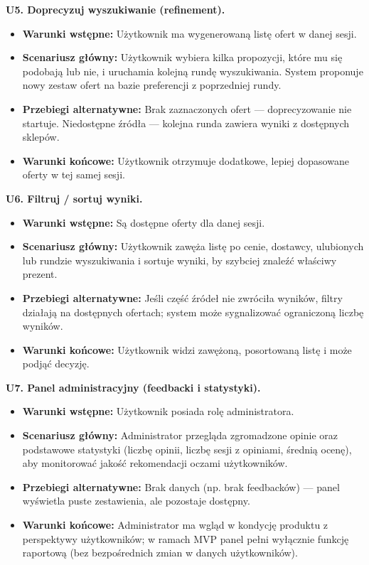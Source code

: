 \documentclass[12pt,a4paper]{article}
\begin{document}
\textbf{U5. Doprecyzuj wyszukiwanie (refinement).}
\begin{itemize}
    \item \textbf{Warunki wstępne:} Użytkownik ma wygenerowaną listę ofert w danej sesji.
    \item \textbf{Scenariusz główny:} Użytkownik wybiera kilka propozycji, które mu się podobają lub nie, i uruchamia kolejną rundę wyszukiwania. System proponuje nowy zestaw ofert na bazie preferencji z poprzedniej rundy.
    \item \textbf{Przebiegi alternatywne:} Brak zaznaczonych ofert — doprecyzowanie nie startuje. Niedostępne źródła — kolejna runda zawiera wyniki z dostępnych sklepów.
    \item \textbf{Warunki końcowe:} Użytkownik otrzymuje dodatkowe, lepiej dopasowane oferty w tej samej sesji.
\end{itemize}

\textbf{U6. Filtruj / sortuj wyniki.}
\begin{itemize}
    \item \textbf{Warunki wstępne:} Są dostępne oferty dla danej sesji.
    \item \textbf{Scenariusz główny:} Użytkownik zawęża listę po cenie, dostawcy, ulubionych lub rundzie wyszukiwania i sortuje wyniki, by szybciej znaleźć właściwy prezent.
    \item \textbf{Przebiegi alternatywne:} Jeśli część źródeł nie zwróciła wyników, filtry działają na dostępnych ofertach; system może sygnalizować ograniczoną liczbę wyników.
    \item \textbf{Warunki końcowe:} Użytkownik widzi zawężoną, posortowaną listę i może podjąć decyzję.
\end{itemize}

\textbf{U7. Panel administracyjny (feedbacki i statystyki).}
\begin{itemize}
    \item \textbf{Warunki wstępne:} Użytkownik posiada rolę administratora.
    \item \textbf{Scenariusz główny:} Administrator przegląda zgromadzone opinie oraz podstawowe statystyki (liczbę opinii, liczbę sesji z opiniami, średnią ocenę), aby monitorować jakość rekomendacji oczami użytkowników.
    \item \textbf{Przebiegi alternatywne:} Brak danych (np. brak feedbacków) — panel wyświetla puste zestawienia, ale pozostaje dostępny.
    \item \textbf{Warunki końcowe:} Administrator ma wgląd w kondycję produktu z perspektywy użytkowników; w ramach MVP panel pełni wyłącznie funkcję raportową (bez bezpośrednich zmian w danych użytkowników).
\end{itemize}
\end{document}
